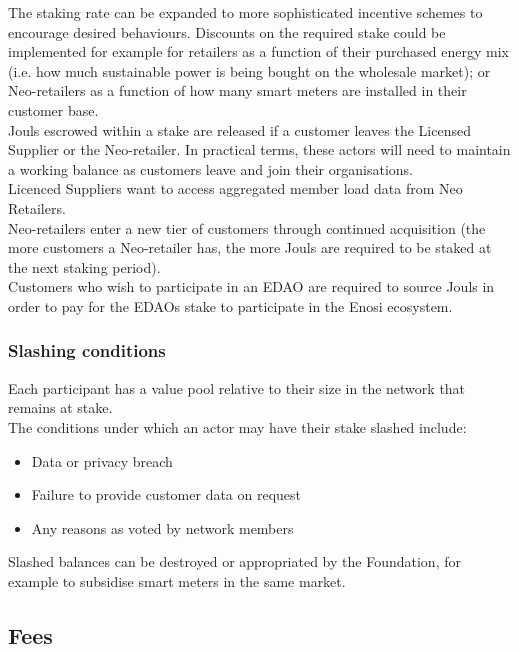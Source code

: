 \documentclass{article}
\theoremstyle{definition}
\theoremstyle{plain} %
\begin{document}
\noindent The staking rate can be expanded to more sophisticated incentive schemes to encourage desired behaviours. Discounts on the required stake could be implemented for example for retailers as a function of their purchased energy mix (i.e. how much sustainable power is being bought on the wholesale market); or Neo-retailers as a function of how many smart meters are installed in their customer base. \\

\noindent Jouls escrowed within a stake are released if a customer leaves the Licensed Supplier or the Neo-retailer. In practical terms, these actors will need to maintain a working balance as customers leave and join their organisations. \\

\noindent Licenced Suppliers want to access aggregated member load data from Neo Retailers.\\

\noindent Neo-retailers enter a new tier of customers through continued acquisition (the more customers a Neo-retailer has, the more Jouls are required to be staked at the next staking period). \\

\noindent Customers who wish to participate in an EDAO are required to source Jouls in order to pay for the EDAOs stake to participate in the Enosi ecosystem.

\subsubsection{Slashing conditions}

Each participant has a value pool relative to their size in the network that remains at stake. \\

\noindent The conditions under which an actor may have their stake slashed include:

\begin{itemize}
\item{Data or privacy breach}
\item{Failure to provide customer data on request}
\item{Any reasons as voted by network members}
\end{itemize}

\noindent Slashed balances can be destroyed or appropriated by the Foundation, for example to subsidise smart meters in the same market. 

\subsection{Fees}
\end{document}
